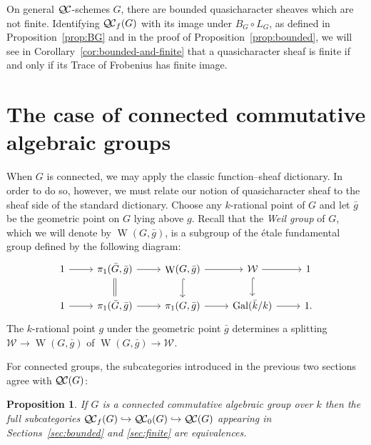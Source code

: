 \documentclass{amsart}
\theoremstyle{plain}
\newtheorem{proposition}[theorem]{Proposition}
\theoremstyle{definition}
\theoremstyle{remark}
\newcommand{\bFq}{\bar{k}}
\newcommand{\Fq}{k}
\newcommand{\Weil}[1]{\mathcal{W}_{#1}}
\DeclareMathOperator{\Gal}{Gal}
\DeclareMathOperator{\W}{W}
\newcommand{\QC}{{\mathcal{Q\hskip-0.8pt C}}}
\newcommand{\QCb}{{\QC_0}}
\newcommand{\QCf}{{\QC_f}}
\newcommand{\bg}{\bar{g}}
\newcommand{\bG}{\bar{G}}
\begin{document}
On general $\QC$-schemes $G$, there are bounded quasicharacter sheaves which are not finite.  Identifying
$\QCf(G)$ with its image under $B_G \circ L_G$, as defined in
Proposition~\ref{prop:BG} and in the proof of Proposition~\ref{prop:bounded},
we will see in Corollary~\ref{cor:bounded-and-finite} that
a quasicharacter sheaf is finite if and only if its Trace of Frobenius has finite image.

\section{The case of connected commutative algebraic groups} \label{sec:connected}

When $G$ is connected, we may apply the classic function--sheaf dictionary.  In order to do so,
however, we must relate our notion of quasicharacter sheaf to the sheaf side of the standard dictionary.
Choose any $\Fq$-rational point of $G$ and let $\bg$ be the geometric point on $G$ lying above $g$.
Recall that the \emph{Weil group} of $G$, which we will denote by $\W(G,\bg)$, is a subgroup of the \'etale
fundamental group defined by the following diagram:
\[
 \begin{tikzcd}
 1 \rar & \ar[equal]{d} \pi_1(\bG, \bg) \rar & \W(G,\bg) \rar \dar[hook] & \Weil{} \rar \dar[hook] & 1 \\
 1 \rar &  \pi_1(\bG, \bg) \rar & \pi_1(G,\bg) \rar & \Gal(\bFq/\Fq) \rar & 1.
 \end{tikzcd}
\]
The $\Fq$-rational point $g$ under the geometric point $\bg$ determines a splitting
$\Weil{}\to \W(G,\bg)$ of $\W(G,\bg)\to \Weil{}$.

For connected groups, the subcategories introduced in the previous two sections agree with $\QC(G)$:

\begin{proposition}\label{prop:connected}
  If $G$ is a connected commutative algebraic group over $\Fq$ then
  the full subcategories $\QCf(G) \hookrightarrow \QCb(G) \hookrightarrow \QC(G)$
  appearing in Sections~\ref{sec:bounded} and \ref{sec:finite} are equivalences.
\end{proposition}
\end{document}
